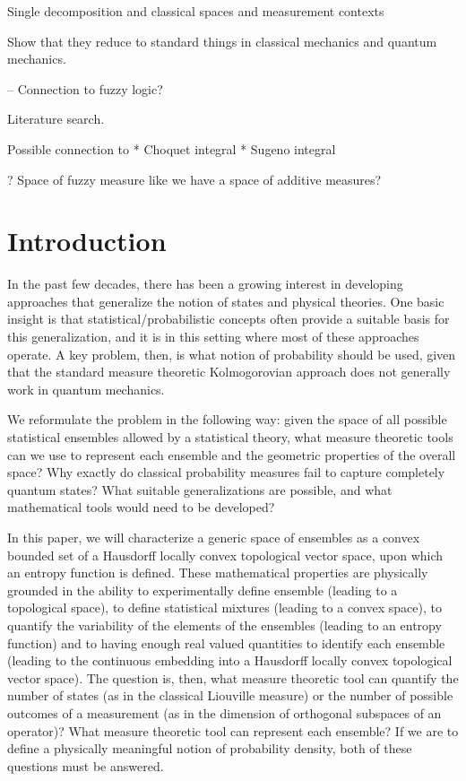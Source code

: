 \documentclass[10pt,twocolumn, nofootinbib]{revtex4-2}
\begin{document}
Single decomposition and classical spaces and measurement contexts

Show that they reduce to standard things in classical mechanics and quantum mechanics.

-- Connection to fuzzy logic?

Literature search.

Possible connection to
* Choquet integral
* Sugeno integral

? Space of fuzzy measure like we have a space of additive measures?


\section{Introduction}

In the past few decades, there has been a growing interest in developing approaches that generalize the notion of states and physical theories. One basic insight is that statistical/probabilistic concepts often provide a suitable basis for this generalization, and it is in this setting where most of these approaches operate. A key problem, then, is what notion of probability should be used, given that the standard measure theoretic Kolmogorovian approach does not generally work in quantum mechanics.

We reformulate the problem in the following way: given the space of all possible statistical ensembles allowed by a statistical theory, what measure theoretic tools can we use to represent each ensemble and the geometric properties of the overall space? Why exactly do classical probability measures fail to capture completely quantum states? What suitable generalizations are possible, and what mathematical tools would need to be developed?

In this paper, we will characterize a generic space of ensembles as a convex bounded set of a Hausdorff locally convex topological vector space, upon which an entropy function is defined. These mathematical properties are physically grounded in the ability to experimentally define ensemble (leading to a topological space), to define statistical mixtures (leading to a convex space), to quantify the variability of the elements of the ensembles (leading to an entropy function) and to having enough real valued quantities to identify each ensemble (leading to the continuous embedding into a Hausdorff locally convex topological vector space). The question is, then, what measure theoretic tool can quantify the number of states (as in the classical Liouville measure) or the number of possible outcomes of a measurement (as in the dimension of orthogonal subspaces of an operator)? What measure theoretic tool can represent each ensemble? If we are to define a physically meaningful notion of probability density, both of these questions must be answered.
\end{document}
